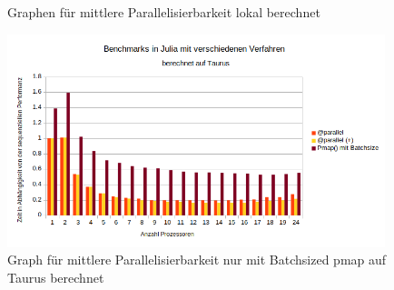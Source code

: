 \documentclass[proseminar,german,utf8]{zihpub}
\begin{document}
\begin{figure}%
    \centering
    \qquad
    \caption{Graphen für mittlere Parallelisierbarkeit lokal berechnet}%
    \label{fig:lokalMedium}%
\end{figure}

\begin{figure}%
    \centering
    \includegraphics[scale=0.8, width=11cm]{bilder/parallel_performance_taurus_medium_OhneBS.png} %
    \caption{Graph für mittlere Parallelisierbarkeit nur mit Batchsized pmap auf Taurus berechnet}%
    \label{fig:taurusMedium}%
\end{figure}
\newpage
\end{document}
